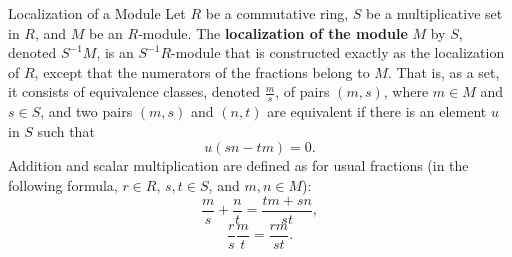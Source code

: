 \begin{definition}{Localization of a Module}{}
    Let $R$ be a commutative ring, $S$ be a multiplicative set in $R$, and $M$ be an $R$-module. The \textbf{localization of the module} $M$ by $S$, denoted $S^{-1}M$, is an $S^{-1}R$-module that is constructed exactly as the localization of $R$, except that the numerators of the fractions belong to $M$. That is, as a set, it consists of equivalence classes, denoted $\frac{m}{s}$, of pairs $(m, s)$, where $m\in M$ and $s\in S$, and two pairs $(m, s)$ and $(n, t)$ are equivalent if there is an element $u$ in $S$ such that
    \[u(sn-tm)=0.\]
    Addition and scalar multiplication are defined as for usual fractions (in the following formula, $r\in R$, $s,t\in S$, and $m,n\in M$):
    \[\frac{m}{s} + \frac{n}{t} = \frac{tm+sn}{st},\]
    \[\frac{r}{s} \frac{m}{t} = \frac{r m}{st}.\]
\end{definition}




